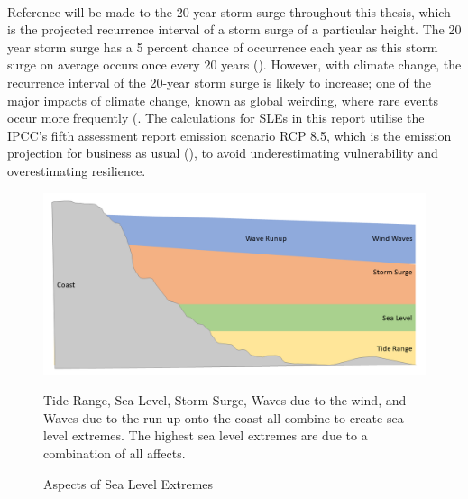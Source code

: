 \paragraph{}

Reference will be made to the 20 year storm surge throughout this thesis, which is the projected recurrence interval of a storm surge of a particular height.  The 20 year storm surge has a 5 percent chance of occurrence each year as this storm surge on average occurs once every 20 years (\cite{hanssen_saksframlegg_2013}). However, with climate change, the recurrence interval of the 20-year storm surge is likely to increase; one of the major impacts of climate change, known as global weirding, where rare events occur more frequently (\cite{wilson_notitle_2019}. The calculations for SLEs in this report utilise the IPCC's fifth assessment report emission scenario RCP 8.5, which is the emission projection for business as usual (\cite{hanssen-bauer_climate_2017}), to avoid underestimating vulnerability and overestimating resilience.  



\begin{figure}[h!]
    \centering
    \includegraphics[width=1\textwidth]{fig_theory/sea level extremes.png}
    \caption{Aspects of Sea Level Extremes}{ Tide Range, Sea Level, Storm Surge, Waves due to the wind, and Waves due to the run-up onto the coast all combine to create sea level extremes. The highest sea level extremes are due to a combination of all affects.}

    \label{fig:theory_SLE_cause}
\end{figure}

